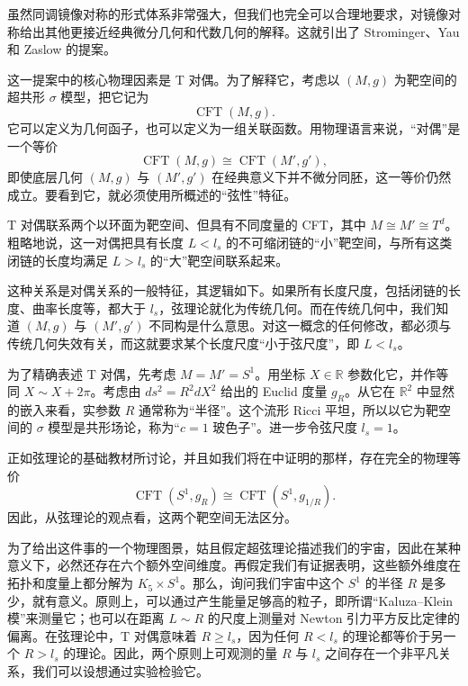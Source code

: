虽然同调镜像对称的形式体系非常强大，但我们也完全可以合理地要求，对镜像对称给出其他更接近经典微分几何和代数几何的解释。这就引出了 Strominger、Yau 和 Zaslow 的提案。

这一提案中的核心物理因素是 T 对偶。为了解释它，考虑以 $(M,g)$ 为靶空间的超共形 $\sigma$ 模型，把它记为
\[
\operatorname{CFT}(M,g).
\]
它可以定义为几何函子，也可以定义为一组关联函数。用物理语言来说，“对偶”是一个等价
\[
\operatorname{CFT}(M,g)\cong\operatorname{CFT}(M',g'),
\]
即使底层几何 $(M,g)$ 与 $(M',g')$ 在经典意义下并不微分同胚，这一等价仍然成立。要看到它，就必须使用所概述的“弦性”特征。

T 对偶联系两个以环面为靶空间、但具有不同度量的 CFT，其中 $M\cong M'\cong T^d$。粗略地说，这一对偶把具有长度 $L<l_s$ 的不可缩闭链的“小”靶空间，与所有这类闭链的长度均满足 $L>l_s$ 的“大”靶空间联系起来。

这种关系是对偶关系的一般特征，其逻辑如下。如果所有长度尺度，包括闭链的长度、曲率长度等，都大于 $l_s$，弦理论就化为传统几何。而在传统几何中，我们知道 $(M,g)$ 与 $(M',g')$ 不同构是什么意思。对这一概念的任何修改，都必须与传统几何失效有关，而这就要求某个长度尺度“小于弦尺度”，即 $L<l_s$。

为了精确表述 T 对偶，先考虑 $M=M'=S^1$。用坐标 $X\in\mathbb{R}$ 参数化它，并作等同 $X\sim X+2\pi$。考虑由 $ds^2=R^2dX^2$ 给出的 Euclid 度量 $g_R$。从它在 $\mathbb{R}^2$ 中显然的嵌入来看，实参数 $R$ 通常称为“半径”。这个流形 Ricci 平坦，所以以它为靶空间的 $\sigma$ 模型是共形场论，称为“$c=1$ 玻色子”。进一步令弦尺度 $l_s=1$。

正如弦理论的基础教材所讨论，并且如我们将在中证明的那样，存在完全的物理等价
\[
\operatorname{CFT}(S^1,g_R)\cong\operatorname{CFT}(S^1,g_{1/R}).
\]
因此，从弦理论的观点看，这两个靶空间无法区分。

为了给出这件事的一个物理图景，姑且假定超弦理论描述我们的宇宙，因此在某种意义下，必然还存在六个额外空间维度。再假定我们有证据表明，这些额外维度在拓扑和度量上都分解为 $K_5\times S^1$。那么，询问我们宇宙中这个 $S^1$ 的半径 $R$ 是多少，就有意义。原则上，可以通过产生能量足够高的粒子，即所谓“Kaluza--Klein 模”来测量它；也可以在距离 $L\sim R$ 的尺度上测量对 Newton 引力平方反比定律的偏离。在弦理论中，T 对偶意味着 $R\geq l_s$，因为任何 $R<l_s$ 的理论都等价于另一个 $R>l_s$ 的理论。因此，两个原则上可观测的量 $R$ 与 $l_s$ 之间存在一个非平凡关系，我们可以设想通过实验检验它。

